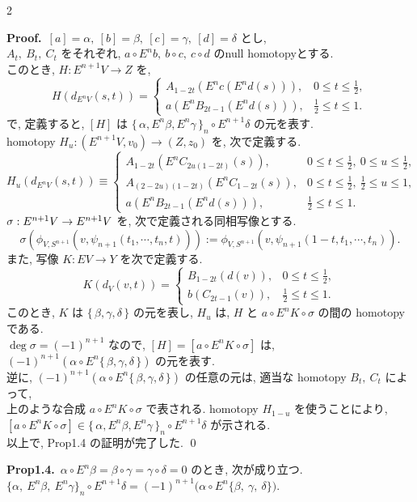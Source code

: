 \documentclass[10pt, leqno]{ltjsarticle}
\newcommand{\Ex}{E}        %
\newcommand{\toda}[1]{\{\,#1\,\}}              %
\newcommand{\todai}[2][]{\{\,#2\,\}_{#1}}      %
\numberwithin{equation}{section}
\theoremstyle{plain}
\theoremstyle{definition}
\theoremstyle{remark}
\begin{document}
\begin{paracol}{2}

\noindent
\textbf{Proof.}\
\([a]=\alpha,\ [b]=\beta,\ [c]=\gamma,\ [d]=\delta\)
とし,\\
\(A_{t},\ B_{t},\ C_{t}\)
をそれぞれ,
\( a\circ\Ex^{n}b,\ b\circ c,\ c\circ d\)
のnull homotopyとする.\\
このとき, 
\(H:E^{n+1}V\to Z\) を,
\[
H(d_{E^n V}(s, t)) = \left\{
\begin{array}{ll}
  A_{1-2t}(E^n c(E^n d(s))),
  & 0\leq t \leq \frac{1}{2},\\
  a(E^n B_{2t-1}(E^n d(s))), 
  & \frac{1}{2} \leq t \leq 1.  
\end{array}
\right.
\]
で, 定義すると,
\([H]\) は 
\(\todai[n]{\alpha, E^n\beta, E^n\gamma}\circ E^{n+1}\delta\)
の元を表す.\\
homotopy
\(H_{u}:(\Ex^{n+1}V,v_0) \longrightarrow (Z,z_0)\)
を, 次で定義する.
\[
H_{u}(d_{\Ex^{n}V}(s,t))\equiv\left\{
\begin{array}{ll}
A_{1-2t}(\Ex^{n}C_{2u(1-2t)}(s)), &
0\leq t \leq \frac{1}{2},\ 0\leq u \leq \frac{1}{2}, \\
A_{(2-2u)(1-2t)}(\Ex^{n}C_{1-2t}(s)), &
0\leq t \leq \frac{1}{2},\ \frac{1}{2} \leq u \leq 1, \\
a(\Ex^{n}B_{2t-1}(\Ex^{n}d(s))), &
\frac{1}{2} \leq t \leq 1.
\end{array}\right.
\]
\(\sigma:\Ex^{n+1}V\to\Ex^{n+1}V \notag\)
を, 次で定義される同相写像とする.
\[
\sigma(\phi_{V,S^{n+1}}(v,\psi_{n+1}(t_{1},\cdots,t_{n},t))) :=
\phi_{V,S^{n+1}}(v,\psi_{n+1}(1-t,t_{1},\cdots,t_{n})).
\]
また, 写像 \(K:EV\to Y\) を次で定義する.
\[
K(d_{V}(v, t)) = \left\{
\begin{array}{ll}
  B_{1-2t}(d(v)),
  & 0\leq t \leq \frac{1}{2},\\
  b(C_{2t-1}(v)), 
  & \frac{1}{2} \leq t \leq 1.  
\end{array}
\right.
\]
このとき,
\(K\) は \(\toda{\beta, \gamma, \delta}\) の元を表し,
\(H_u\)
は, \(H\) と \(a\circ E^n K \circ \sigma\) 
の間の homotopy である.\\
\(\deg \sigma = (-1)^{n+1}\) なので,
\([H] = [a\circ E^n K\circ \sigma]\)
は,
\((-1)^{n+1}(\alpha\circ E^n\toda{\beta, \gamma, \delta})\)
の元を表す.\\
逆に, 
\((-1)^{n+1}(\alpha\circ E^n\toda{\beta, \gamma, \delta})\)
の任意の元は,
適当な homotopy \(B_t,\ C_t\) によって,\\
上のような合成 \(a\circ E^n K\circ \sigma\)
で表される.
homotopy \(H_{1-u}\) を使うことにより,\\
\(
[a\circ E^n K\circ\sigma]
\in \todai[n]{\alpha, E^n\beta, E^n\gamma}\circ E^{n+1}\delta
\)
が示される.\\
以上で, Prop1.4 の証明が完了した.
\qed

\switchcolumn

\noindent
\textbf{Prop1.4.}\
$\alpha\circ \Ex^n\beta=\beta\circ\gamma=\gamma\circ\delta=0$ のとき, 
次が成り立つ.\\
\(
\{\alpha,\ \Ex^n\beta,\ \Ex^n\gamma\}_n\circ\Ex^{n+1}\delta
=
(-1)^{n+1}\bigl(\alpha\circ \Ex^n\{\beta,\ \gamma,\ \delta\}\bigr).
\)

\end{paracol}
\end{document}
